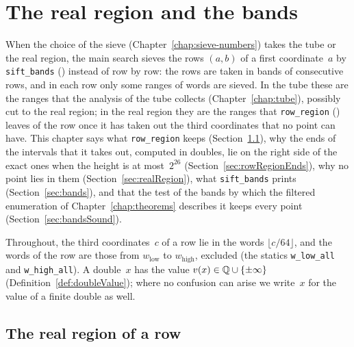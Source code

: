 \chapter{The real region and the bands}\label{chap:region}

When the choice of the sieve (Chapter~\ref{chap:sieve-numbers}) takes the tube or the real region,
the main search sieves the rows $(a, b)$ of a first coordinate~$a$ by \texttt{sift\_bands}
() instead of row by row: the rows are taken in bands of consecutive
rows, and in each row only some ranges of words are sieved. In the tube these are the ranges that
the analysis of the tube collects (Chapter~\ref{chap:tube}), possibly cut to the real region; in
the real region they are the ranges that \texttt{row\_region} ()
leaves of the row once it has taken out the third coordinates that no point can have. This chapter
says what \texttt{row\_region} keeps (Section~\ref{sec:rowRegion}), why the ends of the intervals
that it takes out, computed in doubles, lie on the right side of the exact ones when the height is
at most~$2^{26}$ (Section~\ref{sec:rowRegionEnds}), why no point lies in them
(Section~\ref{sec:realRegion}), what \texttt{sift\_bands} prints (Section~\ref{sec:bands}), and
that the test of the bands by which the filtered enumeration of Chapter~\ref{chap:theorems}
describes it keeps every point (Section~\ref{sec:bandsSound}).

Throughout, the third coordinates~$c$ of a row lie in the words $\lfloor c/64 \rfloor$, and the
words of the row are those from $w_{\mathrm{low}}$ to $w_{\mathrm{high}}$, excluded (the statics
\texttt{w\_low\_all} and \texttt{w\_high\_all}). A double~$x$ has the value
$v(x) \in \mathbb{Q} \cup \{\pm\infty\}$ (Definition~\ref{def:doubleValue}); where no confusion can arise
we write~$x$ for the value of a finite double as well.

\section{The real region of a row}\label{sec:rowRegion}

